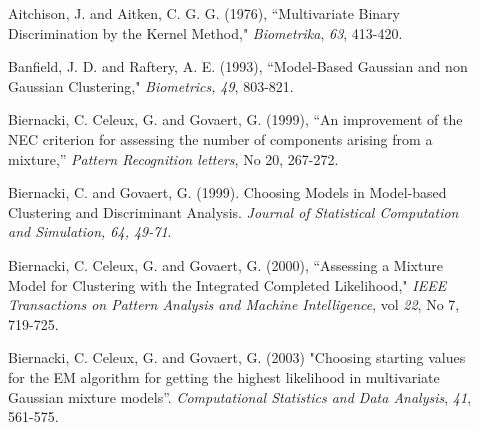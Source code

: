 \begin{description}
\item[    ] Aitchison, J. and Aitken, C. G. G. (1976), ``Multivariate Binary Discrimination by the Kernel Method,"
{\em Biometrika}, {\em 63}, 413-420.
\item[    ] Banfield, J. D. and Raftery, A. E. (1993), ``Model-Based
Gaussian and non Gaussian Clustering," {\em Biometrics,} {\em 49}, 803-821.
\item[    ] Biernacki, C. Celeux, G. and Govaert, G. (1999), ``An improvement of the NEC criterion for assessing the number of components arising from a mixture,''
{\em Pattern Recognition letters}, No 20, 267-272.
\item[    ] Biernacki, C. and Govaert, G. (1999). Choosing Models in Model-based Clustering and Discriminant Analysis.
{\em Journal of Statistical Computation and Simulation, 64, 49-71}.
\item[    ] Biernacki, C. Celeux, G. and Govaert, G. (2000), ``Assessing a Mixture Model for Clustering with the Integrated Completed Likelihood,"
{\em IEEE Transactions on Pattern Analysis and Machine Intelligence}, vol {\em 22}, No 7, 719-725.
\item[    ] Biernacki, C. Celeux, G. and Govaert, G. (2003) "Choosing starting values for the EM algorithm for getting the highest
likelihood in multivariate Gaussian mixture models''. {\em Computational Statistics and Data Analysis}, {\em 41}, 561-575.

\end{description}
